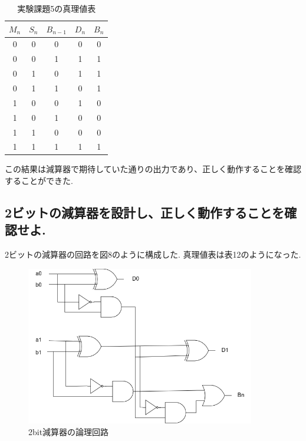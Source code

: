 \documentclass[titlepage]{jsarticle}
\theoremstyle{definition}
\begin{document}
\begin{table}[htbp]
	\caption{実験課題5の真理値表}
	\centering
	\begin{tabular}{|c|c|c||c|c|} \hline
		$M_n$ & $S_n$ & $B_{n-1}$ & $D_n$ & $B_n$ \\ \hline \hline
		0 & 0 & 0 & 0 & 0 \\ \hline
		0 & 0 & 1 & 1 & 1 \\ \hline
		0 & 1 & 0 & 1 & 1 \\ \hline
		0 & 1 & 1 & 0 & 1 \\ \hline
		1 & 0 & 0 & 1 & 0 \\ \hline
		1 & 0 & 1 & 0 & 0 \\ \hline
		1 & 1 & 0 & 0 & 0 \\ \hline
		1 & 1 & 1 & 1 & 1 \\ \hline
	\end{tabular}
\end{table}


この結果は減算器で期待していた通りの出力であり、正しく動作することを確認することができた.

\subsection{2ビットの減算器を設計し、正しく動作することを確認せよ.}

2ビットの減算器の回路を図8のように構成した.
真理値表は表12のようになった.

\begin{figure}[htbp]
	\begin{center}
		\includegraphics[width=100mm]{2bitsub.png}
		\caption{2bit減算器の論理回路}
	\end{center}
\end{figure}
\end{document}

